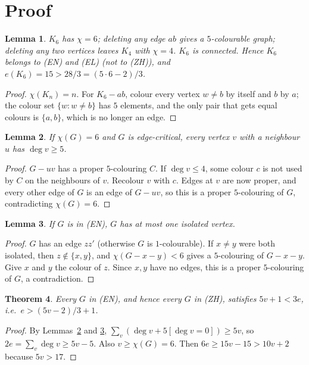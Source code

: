 \documentclass[11pt]{article}
\newtheorem{theorem}{Theorem}
\newtheorem{lemma}[theorem]{Lemma}
\theoremstyle{definition}
\theoremstyle{remark}
\renewcommand{\_}{\oldus\allowbreak}
\begin{document}
\section{Proof}

\begin{lemma}\label{lem:k6}
$K_6$ has $\chi=6$; deleting any edge $ab$ gives a $5$-colourable graph; deleting any two vertices leaves
$K_4$ with $\chi=4$. $K_6$ is connected. Hence $K_6$ belongs to (EN) and (EL) (not to (ZH)), and
$e(K_6)=15>28/3=(5\cdot6-2)/3$.
\end{lemma}
\begin{proof}
$\chi(K_n)=n$. For $K_6-ab$, colour every vertex $w\ne b$ by itself and $b$ by $a$; the colour set
$\{w: w\ne b\}$ has $5$ elements, and the only pair that gets equal colours is $\{a,b\}$, which is no
longer an edge.
\end{proof}

\begin{lemma}\label{lem:deg}
If $\chi(G)=6$ and $G$ is edge-critical, every vertex $v$ with a neighbour $u$ has $\deg v\ge5$.
\end{lemma}
\begin{proof}
$G-uv$ has a proper $5$-colouring $C$. If $\deg v\le4$, some colour $c$ is not used by $C$ on the
neighbours of $v$. Recolour $v$ with $c$. Edges at $v$ are now proper, and every other edge of $G$ is an
edge of $G-uv$, so this is a proper $5$-colouring of $G$, contradicting $\chi(G)=6$.
\end{proof}

\begin{lemma}\label{lem:iso}
If $G$ is in (EN), $G$ has at most one isolated vertex.
\end{lemma}
\begin{proof}
$G$ has an edge $zz'$ (otherwise $G$ is $1$-colourable). If $x\ne y$ were both isolated, then
$z\notin\{x,y\}$, and $\chi(G-x-y)<6$ gives a $5$-colouring of $G-x-y$. Give $x$ and $y$ the colour of
$z$. Since $x,y$ have no edges, this is a proper $5$-colouring of $G$, a contradiction.
\end{proof}

\begin{theorem}\label{thm:count}
Every $G$ in (EN), and hence every $G$ in (ZH), satisfies $5v+1<3e$, i.e.\ $e>(5v-2)/3+1$.
\end{theorem}
\begin{proof}
By Lemmas~\ref{lem:deg} and \ref{lem:iso}, $\sum_v(\deg v+5[\deg v=0])\ge5v$, so
$2e=\sum_v\deg v\ge5v-5$. Also $v\ge\chi(G)=6$. Then $6e\ge15v-15>10v+2$ because $5v>17$.
\end{proof}
\end{document}
